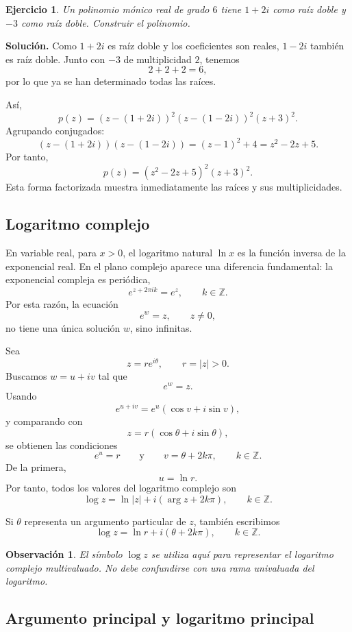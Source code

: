 \documentclass[12pt]{article}
\newtheorem{ejercicio}{Ejercicio}[section]
\newtheorem{Obs}{Observaci\'on}[section]
\begin{document}
\begin{ejercicio}
Un polinomio mónico real de grado $6$ tiene $1+2i$ como raíz doble y $-3$
como raíz doble. Construir el polinomio.
\end{ejercicio}

\textbf{Solución.}
Como $1+2i$ es raíz doble y los coeficientes son reales, $1-2i$ también es
raíz doble. Junto con $-3$ de multiplicidad $2$, tenemos
\[
2+2+2=6,
\]
por lo que ya se han determinado todas las raíces.

Así,
\[
p(z)=(z-(1+2i))^2(z-(1-2i))^2(z+3)^2.
\]
Agrupando conjugados:
\[
(z-(1+2i))(z-(1-2i))
=(z-1)^2+4
=z^2-2z+5.
\]
Por tanto,
\[
\boxed{
p(z)=(z^2-2z+5)^2(z+3)^2.
}
\]
Esta forma factorizada muestra inmediatamente las raíces y sus
multiplicidades.

\subsection*{Logaritmo complejo}


En variable real, para $x>0$, el logaritmo natural $\ln x$ es la función
inversa de la exponencial real. En el plano complejo aparece una diferencia
fundamental: la exponencial compleja es periódica,
\[
e^{z+2\pi i k}=e^z,\qquad k\in\mathbb Z.
\]
Por esta razón, la ecuación
\[
e^w=z,\qquad z\neq0,
\]
no tiene una única solución $w$, sino infinitas.

Sea
\[
z=re^{i\theta},\qquad r=|z|>0.
\]
Buscamos $w=u+iv$ tal que
\[
e^w=z.
\]
Usando
\[
e^{u+iv}=e^u(\cos v+i\sin v),
\]
y comparando con
\[
z=r(\cos\theta+i\sin\theta),
\]
se obtienen las condiciones
\[
e^u=r
\qquad\text{y}\qquad
v=\theta+2k\pi,\qquad k\in\mathbb Z.
\]
De la primera,
\[
u=\ln r.
\]
Por tanto, todos los valores del logaritmo complejo son
\[
\boxed{
\log z=\ln|z|+i(\arg z+2k\pi),\qquad k\in\mathbb Z.
}
\]

Si $\theta$ representa un argumento particular de $z$, también escribimos
\[
\boxed{
\log z=\ln r+i(\theta+2k\pi),\qquad k\in\mathbb Z.
}
\]

\begin{Obs}
El símbolo $\log z$ se utiliza aquí para representar el logaritmo complejo
multivaluado. No debe confundirse con una rama univaluada del logaritmo.
\end{Obs}

\subsection*{Argumento principal y logaritmo principal}
\end{document}
